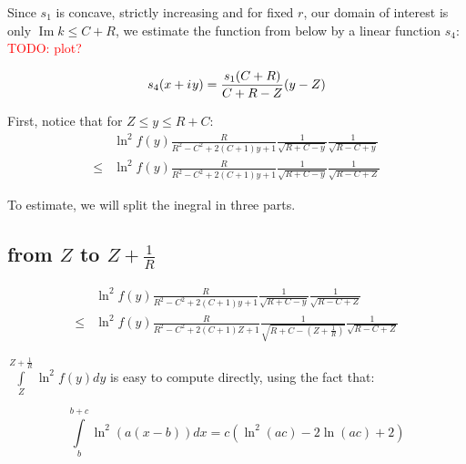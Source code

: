 \documentclass[12pt, a4paper]{article}
\newcommand{\mcO}{\mathcal{O}}
\newcommand{\iu}{{i\mkern1mu}}
\renewcommand{\Im}{\operatorname{Im}}
\newcommand{\todo}[1]{{\large \textcolor{red}{TODO: #1}}}
\begin{document}
Since $s_1$ is concave, strictly increasing and for fixed $r$, our domain of interest is only $\Im k \le C + R$, we estimate the function from below by a linear function $s_4$: \todo{plot?}

\[
s_4(x + \iu y) = 
\frac{s_1(C + R)}{C + R - Z} (y - Z)
\]




First, notice that for $Z \le y \le R + C$:
\begin{align*}
    & \ln^2 f(y) \frac{R}{R^2 - C^2 + 2 (C + 1) y + 1} \frac{1}{\sqrt{R + C - y}} \frac{1}{\sqrt{R - C + y}} \\
\le & \ln^2 f(y) \frac{R}{R^2 - C^2 + 2 (C + 1) y + 1} \frac{1}{\sqrt{R + C - y}} \frac{1}{\sqrt{R - C + Z}}
\end{align*}


To estimate, we will split the inegral in three parts.

\subsection*{from $Z$ to $Z + \frac{1}{R}$}

\begin{align*}
       & \ln^2 f(y) \frac{R}{R^2 - C^2 + 2 (C + 1) y + 1} \frac{1}{\sqrt{R + C - y}} \frac{1}{\sqrt{R - C + Z}}
\\ \le & \ln^2 f(y) \frac{R}{R^2 - C^2 + 2 (C + 1) Z + 1} \frac{1}{\sqrt{R + C - (Z + \frac{1}{R})}} \frac{1}{\sqrt{R - C + Z}}
\end{align*}

$\int\limits_{Z}^{Z + \frac{1}{R}} \ln^2 f(y) dy$ is easy to compute directly, using the fact that:

\[
    \int\limits_b^{b + c} \ln^2 (a (x - b)) dx = c (\ln^2(a c) - 2 \ln (a c) + 2)
\]
\end{document}
